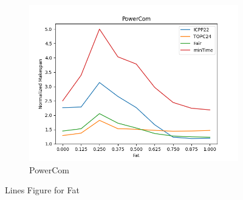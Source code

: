 \documentclass{article}
\begin{document}
\begin{figure}[htbp]
\begin{subfigure}[b]{0.32\textwidth}\includegraphics[width=\textwidth]{Results/Fat/Fat_PowerCom}\caption{PowerCom}\label{fig:lines_figures_Fat_PowerCom}\end{subfigure}
\hfill
\caption{Lines Figure for Fat}
\label{fig:lines_figures_Fat}
\end{figure}
\end{document}

